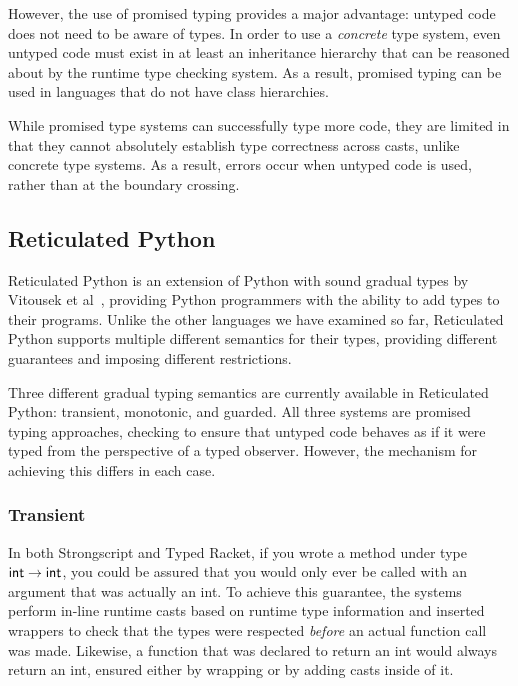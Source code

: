 \documentclass[a4paper,USenglish]{tex/lipics-v2016}
\begin{document}
However, the use of promised typing provides a major advantage: untyped code
does not need to be aware of types. In order to use a \emph{concrete} type
system, even untyped code must exist in at least an inheritance hierarchy
that can be reasoned about by the runtime type checking system. As a result,
promised typing can be used in languages that do not have class hierarchies.

While promised type systems can successfully type more code, they are
limited in that they cannot absolutely establish type correctness across
casts, unlike concrete type systems. As a result, errors occur when untyped
code is used, rather than at the boundary crossing.

\subsection{Reticulated Python}

Reticulated Python is an extension of Python with sound gradual types by
Vitousek et al~\cite{siek14}, providing Python programmers with
the ability to add types to their programs. Unlike the other languages we
have examined so far, Reticulated Python supports multiple different
semantics for their types, providing different guarantees and imposing
different restrictions.

Three different gradual typing semantics are currently available in
Reticulated Python: transient, monotonic, and guarded. All three systems are
promised typing approaches, checking to ensure that untyped code behaves as
if it were typed from the perspective of a typed observer. However, the
mechanism for achieving this differs in each case.

\subsubsection{Transient}

In both Strongscript and Typed Racket, if you wrote a method 
under type ${\sf{int}} \rightarrow {\sf{int}}$, you could be
assured that you would only ever be called with an argument that was
actually an int. To achieve this guarantee, the systems perform 
in-line runtime casts based on runtime type information and
inserted wrappers to check that the types were respected \emph{before} an
actual function call was made. Likewise, a function that was declared to
return an int would always return an int, ensured either by wrapping or by
adding casts inside of it.
\end{document}
